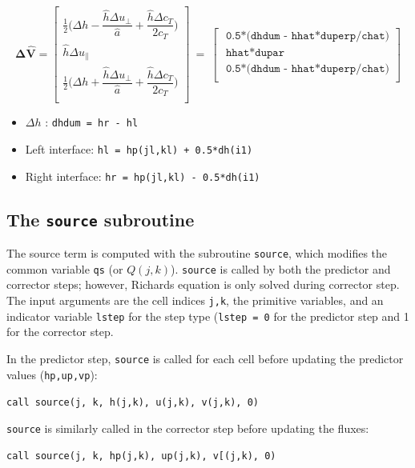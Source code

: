 \documentclass{article}
\newcommand{\code}[1]{\texttt{#1}}
\begin{document}
 \[ \mathbf{\Delta \hat{V}} = 
\begin{bmatrix}
	\frac{1}{2} \bigg( \Delta h - \dfrac{\hat h \Delta u_{\perp} }{\hat a} +
	 \dfrac{\hat h \Delta c_T }{2  c_T}\bigg) \\[.2cm]
      \hat h \Delta u_\parallel   \\[.2cm]
   	\frac{1}{2} \bigg( \Delta h + \dfrac{\hat h \Delta u_{\perp} }{\hat a} +
	 \dfrac{\hat h \Delta c_T }{2  c_T}\bigg) 
	 \\
\end{bmatrix} \ =  \ 
\begin{bmatrix}
 \code{ 0.5*(dhdum - hhat*duperp/chat)}  \\[.2cm]
 \code{ hhat*dupar}  \\[.2cm]
 \code{ 0.5*(dhdum - hhat*duperp/chat)}  \\
\end{bmatrix} 
\]

  \begin{itemize}
 	\item  $\Delta h$ : \code{dhdum = hr - hl } 
 	\item  Left interface:   \code{hl = hp(jl,kl) + 0.5*dh(i1)}
  	\item  Right interface:   \code{hr = hp(jl,kl) - 0.5*dh(i1)}
 \end{itemize}
 

\subsection{The \code{source} subroutine}

 The source term is computed with the subroutine \code{source}, which modifies the common variable \code{qs} (or $Q(j,k)$).
  \code{source} is called by both the predictor and corrector steps; however, Richards equation is only solved during corrector step. 
 The input arguments are the  cell indices \code{j,k}, the primitive variables, and an indicator variable \code{lstep} for the step type (\code{lstep = 0} for the predictor step and 1 for the corrector step.		
 
In the predictor step, \code{source} is called for each cell before updating the predictor values (\code{hp,up,vp}):
\begin{center}
\code{call source(j, k, h(j,k), u(j,k), v(j,k), 0)}
\end{center}

 
\code{source} is similarly  called in the corrector step before updating the fluxes: 
\begin{center}
\code{call source(j, k, hp(j,k), up(j,k), v[(j,k), 0)}
\end{center}
\end{document}

